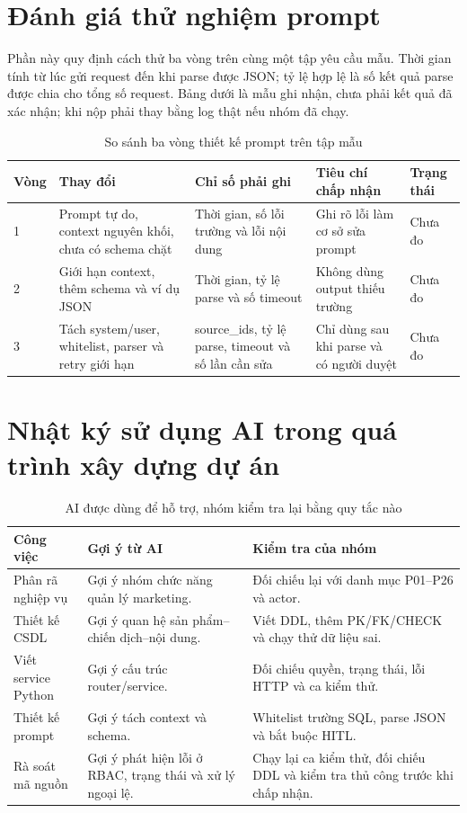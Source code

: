 \section{Đánh giá thử nghiệm prompt}

Phần này quy định cách thử ba vòng trên cùng một tập yêu cầu mẫu. Thời gian tính từ lúc gửi request đến khi parse được JSON; tỷ lệ hợp lệ là số kết quả parse được chia cho tổng số request. Bảng dưới là mẫu ghi nhận, chưa phải kết quả đã xác nhận; khi nộp phải thay bằng log thật nếu nhóm đã chạy.

\begin{table}[h!]
\centering
\small
\caption{So sánh ba vòng thiết kế prompt trên tập mẫu}
\begin{tabularx}{\textwidth}{|C{1.0cm}|L{4.3cm}|C{2.0cm}|C{2.0cm}|Y|}
\hline
\textbf{Vòng} & \textbf{Thay đổi} & \textbf{Chỉ số phải ghi} & \textbf{Tiêu chí chấp nhận} & \textbf{Trạng thái}\\ & Prompt tự do, context nguyên khối, chưa có schema chặt & Thời gian, số lỗi trường và lỗi nội dung & Ghi rõ lỗi làm cơ sở sửa prompt & Chưa đo\\ & Giới hạn context, thêm schema và ví dụ JSON & Thời gian, tỷ lệ parse và số timeout & Không dùng output thiếu trường & Chưa đo\\ & Tách system/user, whitelist, parser và retry giới hạn & source\_ids, tỷ lệ parse, timeout và số lần cần sửa & Chỉ dùng sau khi parse và có người duyệt & Chưa đo\\\hline
\end{tabularx}
\end{table}

\section{Nhật ký sử dụng AI trong quá trình xây dựng dự án}

\begin{table}[h!]
\centering
\small
\caption{AI được dùng để hỗ trợ, nhóm kiểm tra lại bằng quy tắc nào}
\begin{tabularx}{\textwidth}{|L{3.3cm}|Y|Y|}
\hline
\textbf{Công việc} & \textbf{Gợi ý từ AI} & \textbf{Kiểm tra của nhóm}\\\hline
Phân rã nghiệp vụ & Gợi ý nhóm chức năng quản lý marketing. & Đối chiếu lại với danh mục P01--P26 và actor.\\\hline
Thiết kế CSDL & Gợi ý quan hệ sản phẩm--chiến dịch--nội dung. & Viết DDL, thêm PK/FK/CHECK và chạy thử dữ liệu sai.\\\hline
Viết service Python & Gợi ý cấu trúc router/service. & Đối chiếu quyền, trạng thái, lỗi HTTP và ca kiểm thử.\\\hline
Thiết kế prompt & Gợi ý tách context và schema. & Whitelist trường SQL, parse JSON và bắt buộc HITL.\\\hline
Rà soát mã nguồn & Gợi ý phát hiện lỗi ở RBAC, trạng thái và xử lý ngoại lệ. & Chạy lại ca kiểm thử, đối chiếu DDL và kiểm tra thủ công trước khi chấp nhận.\\\hline
\end{tabularx}
\end{table}

